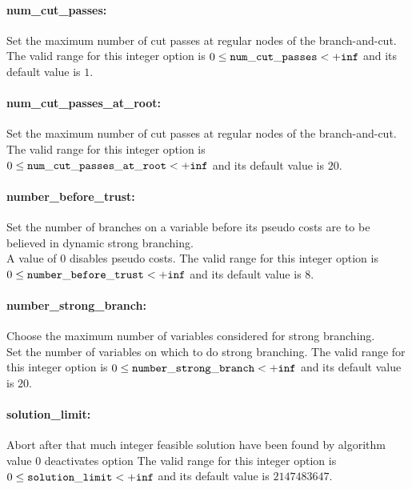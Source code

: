 \paragraph{num\_cut\_passes:}\label{sec:num_cut_passes} Set the maximum number of cut passes at regular nodes of the branch-and-cut. $\;$ \\
 The valid range for this integer option is
$0 \le {\tt num\_cut\_passes } <  {\tt +inf}$
and its default value is $1$.


\paragraph{num\_cut\_passes\_at\_root:}\label{sec:num_cut_passes_at_root} Set the maximum number of cut passes at regular nodes of the branch-and-cut. $\;$ \\
 The valid range for this integer option is
$0 \le {\tt num\_cut\_passes\_at\_root } <  {\tt +inf}$
and its default value is $20$.


\paragraph{number\_before\_trust:}\label{sec:number_before_trust} Set the number of branches on a variable before its pseudo costs are to be believed in dynamic strong branching. $\;$ \\
 A value of 0 disables pseudo costs. The valid range for this integer option is
$0 \le {\tt number\_before\_trust } <  {\tt +inf}$
and its default value is $8$.


\paragraph{number\_strong\_branch:}\label{sec:number_strong_branch} Choose the maximum number of variables considered for strong branching. $\;$ \\
 Set the number of variables on which to do strong
branching. The valid range for this integer option is
$0 \le {\tt number\_strong\_branch } <  {\tt +inf}$
and its default value is $20$.


\paragraph{solution\_limit:}\label{sec:solution_limit} Abort after that much integer feasible solution have been found by algorithm $\;$ \\
 value 0 deactivates option The valid range for this integer option is
$0 \le {\tt solution\_limit } <  {\tt +inf}$
and its default value is $2147483647$.


